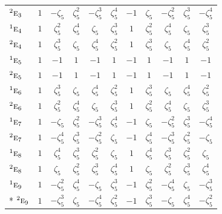 \documentclass[10pt,a4paper]{article}
\numberwithin{equation}{section}
\newcommand{\irr}[1]{\text{\normalfont\scshape #1}}
\newcommand{\conjpair}[1]{{}^{#1}}
\newcommand{\rootunity}[1]{\zeta_{#1}}
\begin{document}
{\begin{longtable}{@{}lcccccccccc@{}}
$\conjpair{2}\irr{e}_{3}$ & $1$ & $-\rootunity{5}$ & $\rootunity{5}^{2}$ & $-\rootunity{5}^{3}$ & $\rootunity{5}^{4}$ & $-1$ & $\rootunity{5}$ & $-\rootunity{5}^{2}$ & $\rootunity{5}^{3}$ & $-\rootunity{5}^{4}$\\
$\conjpair{1}\irr{e}_{4}$ & $1$ & $\rootunity{5}^{2}$ & $\rootunity{5}^{4}$ & $\rootunity{5}$ & $\rootunity{5}^{3}$ & $1$ & $\rootunity{5}^{2}$ & $\rootunity{5}^{4}$ & $\rootunity{5}$ & $\rootunity{5}^{3}$\\
$\conjpair{2}\irr{e}_{4}$ & $1$ & $\rootunity{5}^{3}$ & $\rootunity{5}$ & $\rootunity{5}^{4}$ & $\rootunity{5}^{2}$ & $1$ & $\rootunity{5}^{3}$ & $\rootunity{5}$ & $\rootunity{5}^{4}$ & $\rootunity{5}^{2}$\\
$\conjpair{1}\irr{e}_{5}$ & $1$ & $-1$ & $1$ & $-1$ & $1$ & $-1$ & $1$ & $-1$ & $1$ & $-1$\\
$\conjpair{2}\irr{e}_{5}$ & $1$ & $-1$ & $1$ & $-1$ & $1$ & $-1$ & $1$ & $-1$ & $1$ & $-1$\\
$\conjpair{1}\irr{e}_{6}$ & $1$ & $\rootunity{5}^{3}$ & $\rootunity{5}$ & $\rootunity{5}^{4}$ & $\rootunity{5}^{2}$ & $1$ & $\rootunity{5}^{3}$ & $\rootunity{5}$ & $\rootunity{5}^{4}$ & $\rootunity{5}^{2}$\\
$\conjpair{2}\irr{e}_{6}$ & $1$ & $\rootunity{5}^{2}$ & $\rootunity{5}^{4}$ & $\rootunity{5}$ & $\rootunity{5}^{3}$ & $1$ & $\rootunity{5}^{2}$ & $\rootunity{5}^{4}$ & $\rootunity{5}$ & $\rootunity{5}^{3}$\\
$\conjpair{1}\irr{e}_{7}$ & $1$ & $-\rootunity{5}$ & $\rootunity{5}^{2}$ & $-\rootunity{5}^{3}$ & $\rootunity{5}^{4}$ & $-1$ & $\rootunity{5}$ & $-\rootunity{5}^{2}$ & $\rootunity{5}^{3}$ & $-\rootunity{5}^{4}$\\
$\conjpair{2}\irr{e}_{7}$ & $1$ & $-\rootunity{5}^{4}$ & $\rootunity{5}^{3}$ & $-\rootunity{5}^{2}$ & $\rootunity{5}$ & $-1$ & $\rootunity{5}^{4}$ & $-\rootunity{5}^{3}$ & $\rootunity{5}^{2}$ & $-\rootunity{5}$\\
$\conjpair{1}\irr{e}_{8}$ & $1$ & $\rootunity{5}^{4}$ & $\rootunity{5}^{3}$ & $\rootunity{5}^{2}$ & $\rootunity{5}$ & $1$ & $\rootunity{5}^{4}$ & $\rootunity{5}^{3}$ & $\rootunity{5}^{2}$ & $\rootunity{5}$\\
$\conjpair{2}\irr{e}_{8}$ & $1$ & $\rootunity{5}$ & $\rootunity{5}^{2}$ & $\rootunity{5}^{3}$ & $\rootunity{5}^{4}$ & $1$ & $\rootunity{5}$ & $\rootunity{5}^{2}$ & $\rootunity{5}^{3}$ & $\rootunity{5}^{4}$\\
$\conjpair{1}\irr{e}_{9}$ & $1$ & $-\rootunity{5}^{2}$ & $\rootunity{5}^{4}$ & $-\rootunity{5}$ & $\rootunity{5}^{3}$ & $-1$ & $\rootunity{5}^{2}$ & $-\rootunity{5}^{4}$ & $\rootunity{5}$ & $-\rootunity{5}^{3}$\\*
$\conjpair{2}\irr{e}_{9}$ & $1$ & $-\rootunity{5}^{3}$ & $\rootunity{5}$ & $-\rootunity{5}^{4}$ & $\rootunity{5}^{2}$ & $-1$ & $\rootunity{5}^{3}$ & $-\rootunity{5}$ & $\rootunity{5}^{4}$ & $-\rootunity{5}^{2}$\\
\bottomrule\end{longtable}}
\end{document}
